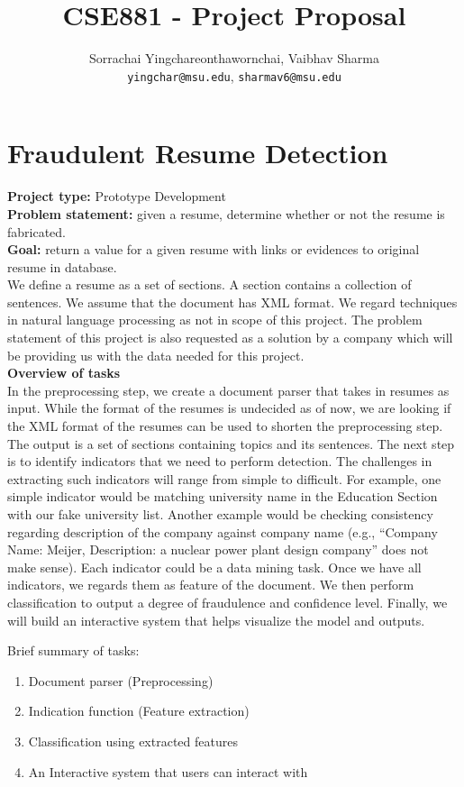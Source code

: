 \documentclass{article}
\title{CSE881 - Project Proposal}
\author{Sorrachai Yingchareonthawornchai, Vaibhav Sharma \\
 \texttt{yingchar@msu.edu}, \texttt{sharmav6@msu.edu}\\
}
\begin{document}
\maketitle
\section{Fraudulent Resume Detection}
\textbf{Project type:} Prototype Development
\\
\textbf{Problem statement:} given a resume, determine whether or not the resume
is fabricated. \\
\textbf{Goal:} return a value for a given resume with links or evidences to
original resume in database. \\

We define a resume as a set of sections. A section contains a collection of
sentences. We assume that the document has XML format. We regard
techniques in natural language processing as not in scope of this
project. The problem statement of this project is also requested as a solution by a company which will be providing us with the data needed for this project.\\

\textbf{Overview of tasks}\\
In the preprocessing step, we create a document parser that takes in
resumes as input. While the format of the resumes is undecided as of now, we are looking if the XML format of the resumes can be used to shorten the preprocessing step. The output is a set of sections containing
topics and its sentences.  The next step is to identify indicators
that we need to perform detection. The challenges in extracting such indicators will range from simple to difficult. For example, one simple indicator would be matching
university name in the Education Section with our fake university list. Another example would be checking consistency
regarding description of the company against company name (e.g.,
``Company Name: Meijer, Description: a nuclear power plant design company'' does not make
sense). Each indicator could be a data mining task. Once we have
all indicators, we regards them as feature of the document. We then
perform classification to output a degree of fraudulence and
confidence level. Finally, we will build an interactive system that
helps visualize the model and outputs. 

Brief summary of tasks: 
\begin{enumerate}
\item Document parser (Preprocessing)
\item Indication function (Feature extraction)
\item Classification using extracted features
\item An Interactive system that users can interact with
\end{enumerate}
\end{document}
